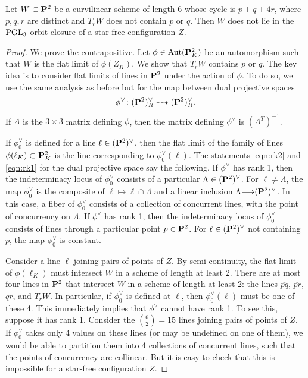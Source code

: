\documentclass[11pt,reqno, letterpaper]{amsart}
\renewcommand{\to}{{\longrightarrow}}
\numberwithin{equation}{section}
\begin{document}
\begin{proposition}\label{prop:pq4r}
  Let $W \subset \P^2$ be a curvilinear scheme of length 6 whose cycle is $p + q + 4r$, where $p,q,r$ are distinct and $T_rW$ does not contain $p$ or $q$.
  Then $W$ does not lie in the $\PGL_3$ orbit closure of a star-free configuration $Z$.
\end{proposition}
\begin{proof}
  We prove the contrapositive.
  Let $\phi \in \Aut(\P^2_K)$ be an automorphism such that $W$ is the flat limit of $\phi(Z_K)$.
  We show that $T_r W$ contains $p$ or $q$.
  The key idea is to consider flat limits of lines in $\P^2$ under the action of $\phi$.
  To do so, we use the same analysis as before but for the map between dual projective spaces
  \[\phi^\vee \colon (\P^2)_R^\vee \dashrightarrow (\P^2)_R^\vee.\]
  If $A$ is the $3 \times 3$ matrix defining $\phi$, then the matrix defining $\phi^\vee$ is $(A^T)^{-1}$.

  If $\phi_0^\vee$ is defined for a line $\ell \in (\P^2)^\vee$, then the flat limit of the family of lines $\phi(\ell_K) \subset \P^2_K$ is the line corresponding to $\phi_0^\vee(\ell)$.
  The statements \eqref{eqn:rk2} and \eqref{eqn:rk1} for the dual projective space say the following.
  If $\phi^\vee$ has rank 1, then the indeterminacy locus of $\phi^\vee_0$ consists of a particular $\Lambda \in (\P^2)^\vee$.
  For $\ell \neq \Lambda$, the map $\phi_0^\vee$ is the composite of $\ell \mapsto \ell \cap \Lambda$ and a linear inclusion $\Lambda \to (\P^2)^\vee$.
  In this case, a fiber of $\phi_0^\vee$ consists of a collection of concurrent lines, with the point of concurrency on $\Lambda$.
  If $\phi^\vee$ has rank 1, then the indeterminacy locus of $\phi^\vee_0$ consists of lines through a particular point $p \in \P^2$.
  For $\ell \in (\P^2)^\vee$ not containing $p$, the map $\phi_0^\vee$ is constant.

  Consider a line $\ell$ joining pairs of points of $Z$.
  By semi-continuity, the flat limit of $\phi(\ell_K)$ must intersect $W$ in a scheme of length at least 2.
  There are at most four lines in $\P^2$ that intersect $W$ in a scheme of length at least 2: the lines $\overline{pq}$, $\overline{pr}$, $\overline{qr}$, and $T_rW$.
  In particular, if $\phi_0^\vee$ is defined at $\ell$, then $\phi_0^\vee(\ell)$ must be one of these 4.
  This immediately implies that $\phi^\vee$ cannot have rank 1.
  To see this, suppose it has rank 1.
  Consider the ${6 \choose  2} = 15$ lines joining pairs of points of $Z$.
  If $\phi_0^\vee$ takes only 4 values on these lines (or may be undefined on one of them), we would be able to partition them into 4 collections of concurrent lines, such that the points of concurrency are collinear.
  But it is easy to check that this is impossible for a star-free configuration $Z$.


\end{proof}
\end{document}
